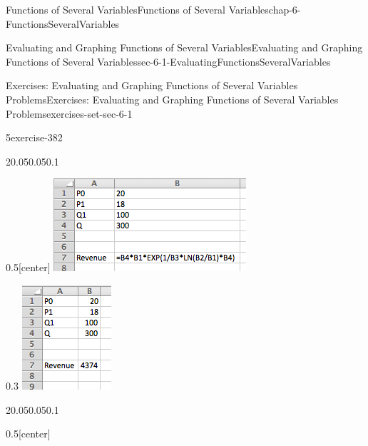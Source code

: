 \documentclass[oneside,10pt,]{book}
\numberwithin{equation}{section}
\begin{document}
\begin{chapterptx}{Functions of Several Variables}{}{Functions of Several Variables}{}{}{chap-6-FunctionsSeveralVariables}
\begin{sectionptx}{Evaluating and Graphing Functions of Several Variables}{}{Evaluating and Graphing Functions of Several Variables}{}{}{sec-6-1-EvaluatingFunctionsSeveralVariables}
\begin{exercises-subsection-numberless}{Exercises: Evaluating and Graphing Functions of Several Variables Problems}{}{Exercises: Evaluating and Graphing Functions of Several Variables Problems}{}{}{exercises-set-sec-6-1}
\begin{exercisegroup}
\begin{divisionexerciseeg}{5}{}{}{exercise-382}
\begin{sidebyside}{2}{0.05}{0.05}{0.1}
\begin{sbspanel}{0.5}[center]
\includegraphics[width=1\linewidth]{images/sec6-1-sol5b.png}
\end{sbspanel}%
\begin{sbspanel}{0.3}%
\includegraphics[width=1\linewidth]{images/sec6-1-sol5c.png}
\end{sbspanel}%
\end{sidebyside}%
\begin{sidebyside}{2}{0.05}{0.05}{0.1}%
\begin{sbspanel}{0.5}[center]%
\hypertarget{p-2170}{}%

\end{sbspanel}
\end{sidebyside}
\end{divisionexerciseeg}
\end{exercisegroup}
\end{exercises-subsection-numberless}
\end{sectionptx}
\end{chapterptx}
\end{document}
